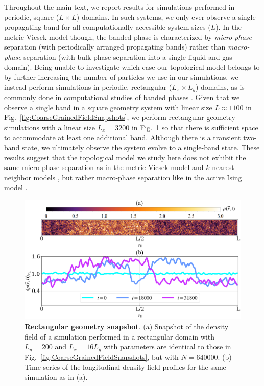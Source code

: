 \documentclass[twoside,twocolumn,9pt]{article}
\begin{document}
Throughout the main text, we report results for simulations performed in periodic, square ($L\times{L}$) domains. In such systems, we only ever observe a single propagating band for all computationally accessible system sizes ($L$). In the metric Vicsek model though, the banded phase is characterized by \textit{micro-phase} separation (with periodically arranged propagating bands) rather than \textit{macro-phase} separation (with bulk phase separation into a single liquid and gas domain)\cite{solon2015phase}. Being unable to investigate which case our topological model belongs to by further increasing the number of particles we use in our simulations, we instead perform simulations in periodic, rectangular ($L_x\times{L_y}$) domains, as is commonly done in computational studies of banded phases \cite{solon2015phase,martin2021fluctuation}. Given that we observe a single band in a square geometry system with linear size $L\approx1100$ in Fig.~\ref{fig:CoarseGrainedFieldSnapshots}, we perform rectangular geometry simulations with a linear size $L_x=3200$ in Fig.~\ref{fig:snapshotRectangular} so that there is sufficient space to accommodate at least one additional band. Although there is a transient two-band state, we ultimately observe the system evolve to a single-band state. These results suggest that the topological model we study here does not exhibit the same micro-phase separation as in the metric Vicsek model \cite{chate2008collective} and $k$-nearest neighbor models \cite{martin2021fluctuation}, but rather macro-phase separation like in the active Ising model \cite{solon2015phase}.

\begin{figure}[h]
\centering
\includegraphics[width=0.99\columnwidth]{Figures/profile_evolution.png}
\caption{\textbf{Rectangular geometry snapshot}. (a) Snapshot of the density field of a simulation performed in a rectangular domain with $L_y=200$ and $L_x=16L_y$ with parameters are identical to those in Fig.~\ref{fig:CoarseGrainedFieldSnapshots}, but with $N=640000$.
(b) Time-series of the longitudinal density field profiles for the same simulation as in (a).}
\label{fig:snapshotRectangular}
\end{figure}
\end{document}
